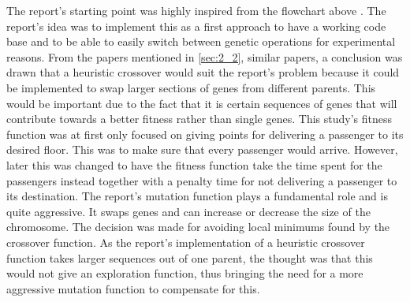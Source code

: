 
The report's starting point was highly inspired from the flowchart above \cite{tartan2016genetic}. The report's idea was to implement this as a first approach to have a working code base and to be able to easily switch between genetic operations for experimental reasons. From the papers mentioned in \ref{sec:2_2}, similar papers, a conclusion was drawn that a heuristic crossover would suit the report's problem because it could be implemented to swap larger sections of genes from different parents. This would be important due to the fact that it is certain sequences of genes that will contribute towards a better fitness rather than single genes. This study's fitness function was at first only focused on giving points for delivering a passenger to its desired floor. This was to make sure that every passenger would arrive. However, later this was changed to have the fitness function take the time spent for the passengers instead together with a penalty time for not delivering a passenger to its destination. The report's mutation function plays a fundamental role and is quite aggressive. It swaps genes and can increase or decrease the size of the chromosome. The decision was made for avoiding local minimums found by the crossover function. As the report's implementation of a heuristic crossover function takes larger sequences out of one parent, the thought was that this would not give an exploration function, thus bringing the need for a more aggressive mutation function to compensate for this.
